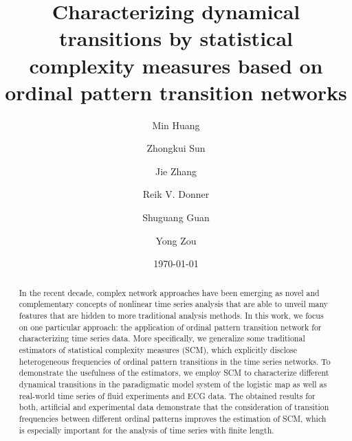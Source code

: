 \documentclass[12pt,aip,cha,reprint,nofootinbib]{revtex4-1}
\begin{document}
\title{Characterizing dynamical transitions by statistical complexity measures based on ordinal pattern transition networks} 

\author{Min Huang}

\author{Zhongkui Sun}

\author{Jie Zhang}

\author{Reik V. Donner}

\author{Shuguang Guan}
	
\author{Yong Zou}

\date{\today}

\begin{abstract}
In the recent decade, complex network approaches have been emerging as novel and complementary concepts of nonlinear time series analysis that are able to unveil many features that are hidden to more traditional analysis methods. In this work, we focus on one particular approach: the application of ordinal pattern transition network for characterizing time series data. More specifically, we generalize some traditional estimators of statistical complexity measures (SCM), which explicitly disclose heterogeneous frequencies of ordinal pattern transitions in the time series networks. To demonstrate the usefulness of the estimators, we employ SCM to characterize different dynamical transitions in the paradigmatic model system of the logistic map as well as real-world time series of fluid experiments and ECG data. The obtained results for both, artificial and experimental data demonstrate that the consideration of transition frequencies between different ordinal patterns improves the estimation of SCM, which is especially important for the analysis of time series with finite length. 
\end{abstract}
\end{document}
